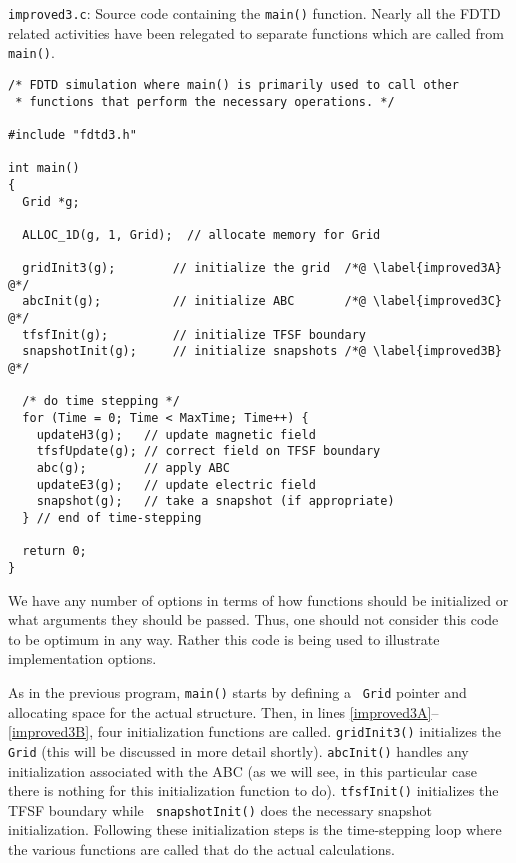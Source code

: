 \begin{program}
{\tt improved3.c}: Source code containing the {\tt main()} function.
Nearly all the FDTD related activities have been relegated to separate
functions which are called from {\tt main()}.  \label{pro:improved3}
\codemiddle
\begin{lstlisting}
/* FDTD simulation where main() is primarily used to call other
 * functions that perform the necessary operations. */

#include "fdtd3.h"

int main()
{
  Grid *g;

  ALLOC_1D(g, 1, Grid);  // allocate memory for Grid

  gridInit3(g);        // initialize the grid  /*@ \label{improved3A} @*/
  abcInit(g);          // initialize ABC       /*@ \label{improved3C} @*/
  tfsfInit(g);         // initialize TFSF boundary
  snapshotInit(g);     // initialize snapshots /*@ \label{improved3B} @*/

  /* do time stepping */
  for (Time = 0; Time < MaxTime; Time++) {
    updateH3(g);   // update magnetic field
    tfsfUpdate(g); // correct field on TFSF boundary
    abc(g);        // apply ABC
    updateE3(g);   // update electric field
    snapshot(g);   // take a snapshot (if appropriate)
  } // end of time-stepping

  return 0;
}
\end{lstlisting}
\end{program}

We have any number of options in terms of how functions should be
initialized or what arguments they should be passed.  Thus, one should
not consider this code to be optimum in any way.  Rather this code is
being used to illustrate implementation options.  

As in the previous program, {\tt main()} starts by defining a {\tt
  Grid} pointer and allocating space for the actual structure.  Then,
in lines \ref{improved3A}--\ref{improved3B}, four initialization
functions are called.  {\tt gridInit3()} initializes the {\tt Grid}
(this will be discussed in more detail shortly).  {\tt abcInit()}
handles any initialization associated with the ABC (as we will see, in
this particular case there is nothing for this initialization function
to do).  {\tt tfsfInit()} initializes the TFSF boundary while {\tt
  snapshotInit()} does the necessary snapshot initialization.
Following these initialization steps is the time-stepping loop where
the various functions are called that do the actual calculations.

